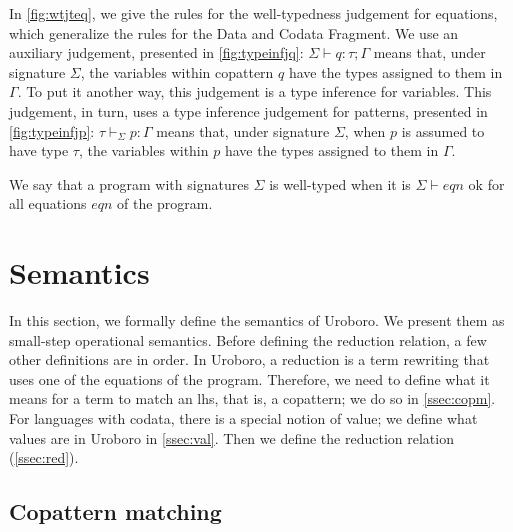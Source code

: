 
In \autoref{fig:wtjteq}, we give the rules for the well-typedness judgement for equations, which generalize the rules for the Data and Codata Fragment. We use an auxiliary judgement, presented in \autoref{fig:typeinfjq}: $\Sigma \vdash q : \tau; \Gamma$ means that, under signature $\Sigma$, the variables within copattern $q$ have the types assigned to them in $\Gamma$. To put it another way, this judgement is a type inference for variables. This judgement, in turn, uses a type inference judgement for patterns, presented in \autoref{fig:typeinfjp}: $\tau \vdash_{\Sigma} p : \Gamma$ means that, under signature $\Sigma$, when $p$ is assumed to have type $\tau$, the variables within $p$ have the types assigned to them in $\Gamma$.

We say that a program with signatures $\Sigma$ is well-typed when it is $\Sigma \vdash eqn \textrm{ ok}$ for all equations $eqn$ of the program.

\section{Semantics}
\label{sec:urosos}

In this section, we formally define the semantics of Uroboro. We present them as small-step operational semantics. Before defining the reduction relation, a few other definitions are in order. In Uroboro, a reduction is a term rewriting that uses one of the equations of the program. Therefore, we need to define what it means for a term to match an lhs, that is, a copattern; we do so in \autoref{ssec:copm}. For languages with codata, there is a special notion of value; we define what values are in Uroboro in \autoref{ssec:val}. Then we define the reduction relation (\autoref{ssec:red}).

\subsection{Copattern matching}
\label{ssec:copm}

